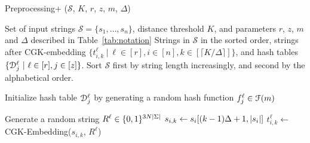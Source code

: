 \begin{algorithm}[t]
\caption{Preprocessing+ ($\mathcal{S}$, $K$, $r$, $z$, $m$, $\Delta$)}
\label{alg:preprocessing2}
\begin{algorithmic}[1]
\Require Set of input strings $\mathcal{S} = \{s_1, \ldots, s_n\}$, distance threshold $K$, and parameters $r$, $z$, $m$ and $\Delta$ described in Table~\ref{tab:notation}
\Ensure  Strings in $\mathcal{S}$ in the sorted order, strings after CGK-embedding $\{t_{i,k}^\ell\ |\ \ell \in [r], i \in [n], k \in [\lceil K/\Delta \rceil]\}$, and hash tables $\{\mathcal{D}_j^{\ell} \ |\ \ell \in [r], j \in [z]\}$.
\State Sort $\mathcal{S}$ first by string length increasingly, and second by the alphabetical order. 

\ForEach{$\ell \in [r]$}
	\State Initialize hash table $\mathcal{D}_j^{\ell} $ by generating a random hash function $f_j^{\ell} \in \mathcal{F}(m)$  
	\EndFor
\EndFor

\ForEach{$\ell \in [r]$}
\State Generate a random string $R^{\ell} \in \{0,1\}^{3 N \left| \Sigma \right|}$
\State $s_{i,k} \gets s_i[(k-1)\Delta+1, \left| s_i \right|]$ \label{line:c-1}
\State $t_{i,k}^{\ell}  \leftarrow $ CGK-Embedding($s_{i,k}$, $R^{\ell}$) \label{line:c-2}
\EndFor
\EndFor
\EndFor
\end{algorithmic}
\end{algorithm}


